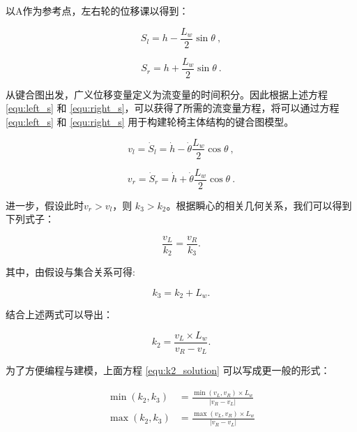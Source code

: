 以A作为参考点，左右轮的位移课以得到： 

\begin{equation}
\label{equ:left_s}
S_l = h
-
\frac{L_w}{2} \sin \theta
\ ,
\end{equation}

\begin{equation}
\label{equ:right_s}
S_r = h
+
\frac{L_w}{2} \sin \theta
\ .
\end{equation}

从键合图出发，广义位移变量定义为流变量的时间积分。因此根据上述方程 \ref{equ:left_s} 和 \ref{equ:right_s}，可以获得了所需的流变量方程，将可以通过方程 \ref{equ:left_s} 和 \ref{equ:right_s} 用于构建轮椅主体结构的键合图模型。

\begin{equation}
\label{equ:left_v}
v_{l}
=
\dot{S}_{l}
=
\dot{h}
-
\dot{\theta} \frac{L_w}{2} \cos \theta
\ ,
\end{equation}

\begin{equation}
\label{equ:right_v}
v_{r}
=
\dot{S}_{r}
=
\dot{h}
+
\dot{\theta} \frac{L_w}{2} \cos \theta
\ .
\end{equation}

进一步，假设此时$ v_{r} > v_{l} $，则 $ k_3 > k_2 $。根据瞬心的相关几何关系，我们可以得到下列式子：

\begin{equation}\label{equ:k2k3_equs}
\frac{v_L}{k_2} = \frac{v_R}{k_3}.
\end{equation}

其中，由假设与集合关系可得:

\begin{equation}\label{equ:k2k3_Lw}
k_3 = k_2 + L_w.
\end{equation}

结合上述两式可以导出：

\begin{equation}\label{equ:k2_solution}
k_2 = \frac{v_L \times L_w}{v_R - v_L}.
\end{equation}

为了方便编程与建模，上面方程 \ref{equ:k2_solution} 可以写成更一般的形式：

\begin{equation}\label{equ:k2k3}
\begin{aligned}
\min (k_2, k_3) &= \frac{\min (v_L, v_R) \times L_w}{|v_R - v_L|} \\
\max (k_2, k_3) &= \frac{\max (v_L, v_R) \times L_w}{|v_R - v_L|}
\end{aligned}
\end{equation}
